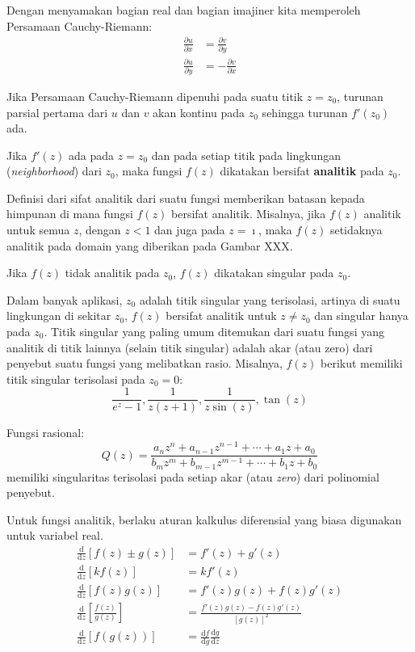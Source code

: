 Dengan menyamakan bagian real dan bagian imajiner kita memperoleh
Persamaan Cauchy-Riemann:
\begin{align}
\frac{\partial u}{\partial x} & = \frac{\partial v}{\partial y} \\
\frac{\partial u}{\partial y} & = -\frac{\partial v}{\partial x}
\end{align}

Jika Persamaan Cauchy-Riemann dipenuhi pada suatu titik $z = z_{0}$,
turunan parsial pertama dari $u$ dan $v$ akan kontinu pada $z_{0}$
sehingga turunan $f'(z_{0})$ ada.

Jika $f'(z)$ ada pada $z=z_{0}$ dan pada setiap titik pada lingkungan
(\emph{neighborhood}) dari $z_{0}$, maka fungsi $f(z)$ dikatakan
bersifat \textbf{analitik} pada $z_{0}$.

Definisi dari sifat analitik dari suatu fungsi memberikan batasan
kepada himpunan di mana fungsi $f(z)$ bersifat analitik. Misalnya,
jika $f(z)$ analitik untuk semua $z$, dengan $z<1$ dan juga pada
$z=\imath$, maka $f(z)$ setidaknya analitik pada domain yang diberikan
pada Gambar XXX.

Jika $f(z)$ tidak analitik pada $z_{0}$, $f(z)$ dikatakan singular pada $z_{0}$.

Dalam banyak aplikasi, $z_{0}$ adalah titik singular yang terisolasi,
artinya di suatu lingkungan di sekitar $z_{0}$, $f(z)$ bersifat
analitik untuk $z\neq z_{0}$ dan singular hanya pada $z_{0}$. Titik
singular yang paling umum ditemukan dari suatu fungsi yang analitik
di titik lainnya (selain titik singular) adalah akar (atau zero) dari
penyebut suatu fungsi yang melibatkan rasio. Misalnya, $f(z)$ berikut
memiliki titik singular terisolasi pada $z_{0}=0$:
\begin{equation*}
\frac{1}{e^{z}-1},\frac{1}{z(z+1)},\frac{1}{z\sin(z)},\tan(z)
\end{equation*}

Fungsi rasional:
\begin{equation*}
Q(z)=\frac{a_{n}z^{n}+a_{n-1}z^{n-1}+\cdots+a_{1}z+a_{0}}{b_{m}z^{m}+b_{m-1}z^{m-1}+\cdots+b_{1}z+b_{0}}    
\end{equation*}
memiliki singularitas terisolasi pada setiap akar (atau \textit{zero}) dari
polinomial penyebut.

Untuk fungsi analitik, berlaku aturan kalkulus diferensial yang biasa
digunakan untuk variabel real.
\begin{align*}
\frac{\mathrm{d}}{\mathrm{d}z}\left[f(z)\pm g(z)\right] & = f'(z)+g'(z) \\
\frac{\mathrm{d}}{\mathrm{d}z}[kf(z)] & = kf'(z) \\
\frac{\mathrm{d}}{\mathrm{d}z}\left[f(z)g(z)\right] & = f'(z)g(z)+f(z)g'(z) \\
\frac{\mathrm{d}}{\mathrm{d}z}\left[\frac{f(z)}{g(z)}\right] & = \frac{f'(z)g(z)-f(z)g'(z)}{\left[g(z)\right]^{2}} \\
\frac{\mathrm{d}}{\mathrm{d}z}\left[f(g(z))\right] & = \frac{\mathrm{d}f}{\mathrm{d}g}\frac{\mathrm{d}g}{\mathrm{d}z}
\end{align*}

